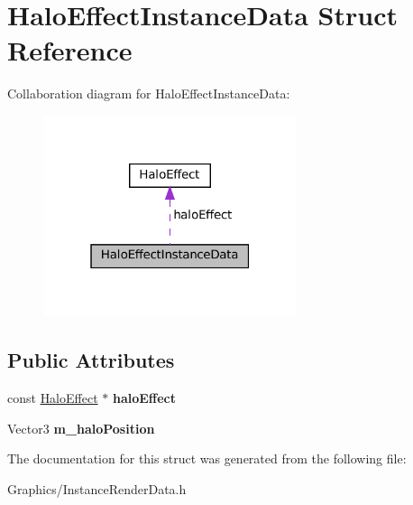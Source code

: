 \hypertarget{structHaloEffectInstanceData}{}\section{Halo\+Effect\+Instance\+Data Struct Reference}
\label{structHaloEffectInstanceData}


Collaboration diagram for Halo\+Effect\+Instance\+Data\+:
\nopagebreak
\begin{figure}[H]
\begin{center}
\leavevmode
\includegraphics[width=211pt]{structHaloEffectInstanceData__coll__graph}
\end{center}
\end{figure}
\subsection*{Public Attributes}
\begin{DoxyCompactItemize}
\item 
\mbox{\label{structHaloEffectInstanceData_a295122f90b9b3fbca4e59e4bd75282bc}} 
const \hyperlink{classHaloEffect}{Halo\+Effect} $\ast$ {\bfseries halo\+Effect}
\item 
\mbox{\label{structHaloEffectInstanceData_a946f37f81ada32117d6b71920b786fd9}} 
Vector3 {\bfseries m\+\_\+halo\+Position}
\end{DoxyCompactItemize}


The documentation for this struct was generated from the following file\+:\begin{DoxyCompactItemize}
\item 
Graphics/Instance\+Render\+Data.\+h\end{DoxyCompactItemize}
